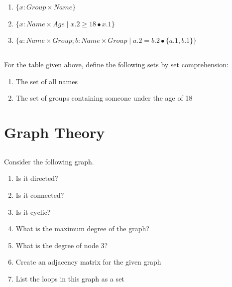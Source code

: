 \documentclass[twocolumn]{article}
\begin{document}
    \begin{enumerate}
        \item $ \{ x : Group \times Name \} $
        \item $ \{ x : Name \times Age \mid x.2 \ge 18 \bullet x.1 \} $
        \item $ \{ a : Name \times Group; b : Name \times Group \mid a.2 = b.2 \bullet \{a.1, b.1\} \} $
    \end{enumerate} 

\subsection{}

    For the table given above, define the following sets by set comprehension:

    \begin{enumerate}
        \item The set of all names
        \item The set of groups containing someone under the age of 18
    \end{enumerate}

\clearpage
\section{Graph Theory}

\subsection{}

    Consider the following graph.

    \begin{figure}[h!]
        \centering
    \end{figure}

    \begin{enumerate}
        \item Is it directed?
        \item Is it connected?
        \item Is it cyclic?
        \item What is the maximum degree of the graph?
        \item What is the degree of node 3?
        \item Create an adjacency matrix for the given graph
        \item List the loops in this graph as a set
    \end{enumerate}
\end{document}

